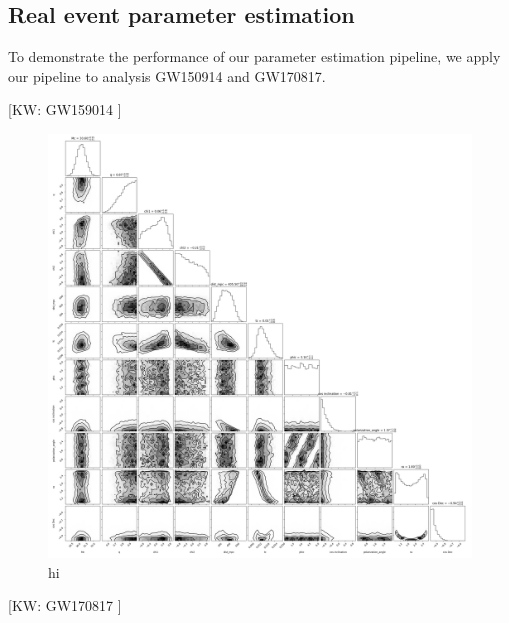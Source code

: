 \documentclass[twocolumn]{aastex631}
\newcommand{\kw}[1]{{\color{rb4}[KW: #1 ]}}
\begin{document}
\subsection{Real event parameter estimation}

To demonstrate the performance of our parameter estimation pipeline, we apply
our pipeline to analysis GW150914 and GW170817. 

\kw{GW159014}

\begin{figure}
\includegraphics[width=0.99\linewidth]{static/GW150914.png}
\caption{
    hi
}
\label{fig:GW150914}
\end{figure}

\kw{GW170817}
\end{document}
